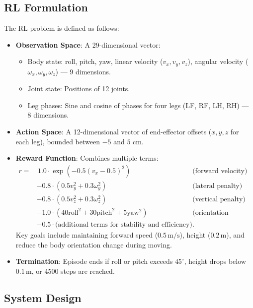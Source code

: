 \documentclass[a4paper,11pt]{article}
\begin{document}
\subsection{RL Formulation}

The RL problem is defined as follows:

\begin{itemize}
    \item \textbf{Observation Space}: A 29-dimensional vector:
    \begin{itemize}
        \item Body state: roll, pitch, yaw, linear velocity (\(v_x, v_y, v_z\)), angular velocity (\(\omega_x, \omega_y, \omega_z\)) — 9 dimensions.
        \item Joint state: Positions of 12 joints.
        \item Leg phases: Sine and cosine of phases for four legs (LF, RF, LH, RH) — 8 dimensions.
    \end{itemize}
    \item \textbf{Action Space}: A 12-dimensional vector of end-effector offsets (\(x, y, z\) for each leg), bounded between \(-5\) and \(5\) cm.
    \item \textbf{Reward Function}: Combines multiple terms:
    \begin{align*}
			r = & \, 1.0 \cdot \exp(-0.5 (v_x - 0.5)^2) & \text{(forward velocity)} \\
					& - 0.8 \cdot (0.5 v_y^2 + 0.3 \omega_y^2) & \text{(lateral penalty)} \\
					& - 0.8 \cdot (0.5 v_z^2 + 0.3 \omega_z^2) & \text{(vertical penalty)} \\
					& - 1.0 \cdot (40 \text{roll}^2 + 30 \text{pitch}^2 + 5 \text{yaw}^2) & \text{(orientation penalty)} \\
					& - 0.5 \cdot \text{(additional terms for stability and efficiency)}.
    \end{align*}
    Key goals include maintaining forward speed (\(0.5 \, \text{m/s}\)), height (\(0.2 \, \text{m}\)), and reduce the body orientation change during moving.
    \item \textbf{Termination}: Episode ends if roll or pitch exceeds \(45^\circ\), height drops below \(0.1 \, \text{m}\), or 4500 steps are reached.
\end{itemize}

\subsection{System Design}
\end{document}
